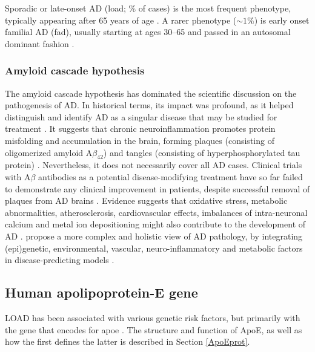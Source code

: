 \documentclass{amsart}
\begin{document}
Sporadic or late-onset AD (\acrshort{load}; \% of cases) is the most frequent phenotype, typically appearing after 65 years of age \cite{Beydoun2014EpidemiologicMeta-analysis}. A rarer phenotype ($\sim1\%$) is early onset familial AD (\acrshort{fad}), usually starting at ages 30–65 and passed in an autosomal dominant fashion \cite{VanCauwenberghe2015ThePerspectives}.

\subsubsection{Amyloid cascade hypothesis}
The amyloid cascade hypothesis has dominated the scientific discussion on the pathogenesis of AD. In historical terms, its impact was profound, as it helped distinguish and identify AD as a singular disease that may be studied for treatment \cite{Hardy2006AlzheimersReappraisal}. It suggests that chronic neuroinflammation promotes protein misfolding and accumulation in the brain, forming plaques (consisting of oligomerized amyloid A$\beta_{42}$) and tangles (consisting of hyperphosphorylated tau protein) \cite{Edwards2019ANeurodegeneration}. Nevertheless, it does not necessarily cover all AD cases. Clinical trials with A$\beta$ antibodies as a potential disease-modifying treatment have so far failed to demonstrate any clinical improvement in patients, despite successful removal of plaques from AD brains \cite{Kepp2023TheReview,Kurkinen2023TheThinking}. Evidence suggests that oxidative stress, metabolic abnormalities, atherosclerosis, cardiovascular effects, imbalances of intra-neuronal calcium and metal ion depositioning might also contribute to the development of AD \cite{Kepp2023TheReview}. \citeauthor{Kepp2023TheReview} propose a more complex and holistic view of AD pathology, by integrating (epi)genetic, environmental, vascular, neuro-inflammatory and metabolic factors in disease-predicting models \cite{Kepp2023TheReview}.

\subsection{Human apolipoprotein-E gene}
LOAD has been associated with various genetic risk factors, but primarily with the gene that encodes for \acrfull{apoe} \cite{Corder1993GeneFamilies}. The structure and function of ApoE, as well as how the first defines the latter is described in Section \ref{ApoEprot}.
\end{document}
